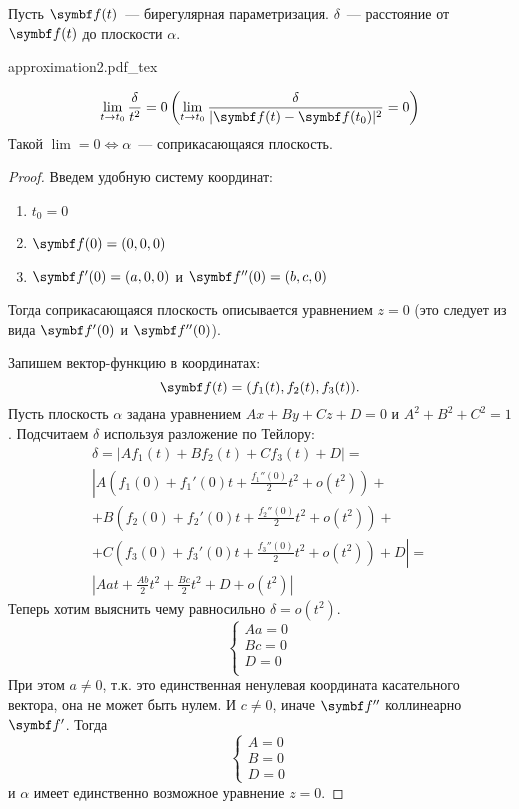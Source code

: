 \documentclass[main]{subfiles}
\begin{document}
\begin{theorem}
    Пусть $\vf(t)$~--- бирегулярная параметризация.
    $\delta$~--- расстояние от $\vf(t)$ до плоскости $\alpha$.
    \begin{center}
        {approximation2.pdf_tex}
    \end{center}
    \[\lim_{t \to t_0} \frac{\delta}{t^2} = 0 \left( \lim_{t \to t_0} \frac{\delta}{|\vf(t) - \vf(t_0)|^2} = 0 \right)\]
    Такой $\lim = 0 \Leftrightarrow \alpha$~--- соприкасающаяся плоскость.
\end{theorem}
\begin{proof}
    Введем удобную систему координат:
    \begin{enumerate}
        \item $t_0 = 0$
        \item $\vf(0) = (0,0,0)$
        \item $\vf'(0) = (a,0,0)$ и $\vf''(0) = (b,c,0)$
    \end{enumerate}
    Тогда соприкасающаяся плоскость описывается уравнением $z = 0$ (это следует из вида $\vf'(0)$ и $\vf''(0)$).

    Запишем вектор-функцию в координатах: \[\vf(t) = (f_1(t), f_2(t), f_3(t)).\]
    Пусть плоскость $\alpha$ задана уравнением $Ax+By+Cz+D = 0$ и $A^2 + B^2 + C^2 = 1$.
    Подсчитаем $\delta$ используя разложение по Тейлору:
    \begin{multline*}
        \delta = |Af_1(t) + Bf_2(t) + Cf_3(t) + D| =\\
        \left| A \left(f_1(0) + f_1'(0)t + \frac{f_1''(0)}{2}t^2 + o(t^2)\right) + \right.\\
        + B \left(f_2(0) + f_2'(0)t + \frac{f_2''(0)}{2}t^2 + o(t^2)\right) + \\
        + \left. C \left(f_3(0) + f_3'(0)t + \frac{f_3''(0)}{2}t^2 + o(t^2)\right) + D \right| = \\
        \left| Aat + \frac{Ab}{2} t^2 + \frac{Bc}{2}t^2 + D + o(t^2) \right|
    \end{multline*}
    Теперь хотим выяснить чему равносильно $\delta = o(t^2)$.
    \[\begin{cases}
            Aa = 0 \\
            Bc = 0 \\
            D = 0  \\
        \end{cases}\]
    При этом $a \neq 0$, т.к. это единственная ненулевая координата касательного вектора, она не может быть нулем.
    И $c \neq 0$, иначе $\vf''$ коллинеарно $\vf'$. Тогда
    \[\begin{cases}
            A = 0 \\
            B = 0 \\
            D = 0
        \end{cases}\]
    и $\alpha$ имеет единственно возможное уравнение $z = 0$.
\end{proof}
\end{document}
